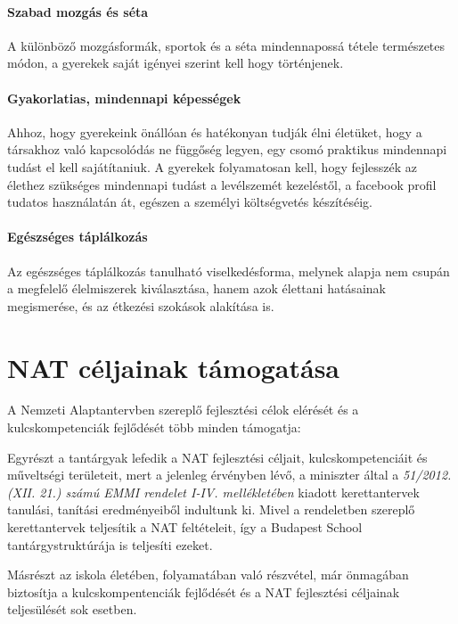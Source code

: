 \paragraph{Szabad mozgás és séta}

A különböző mozgásformák, sportok és a séta mindennapossá tétele természetes módon, a gyerekek saját igényei szerint kell hogy történjenek.

\paragraph{Gyakorlatias, mindennapi képességek}

Ahhoz, hogy gyerekeink önállóan és hatékonyan tudják élni életüket, hogy a társakhoz való kapcsolódás ne függőség legyen, egy csomó praktikus mindennapi tudást el kell sajátítaniuk. A gyerekek folyamatosan kell, hogy fejlesszék az élethez szükséges mindennapi tudást a levélszemét kezeléstől, a facebook profil tudatos használatán át, egészen a személyi költségvetés készítéséig.

\paragraph{Egészséges táplálkozás}

Az egészséges táplálkozás tanulható viselkedésforma, melynek alapja nem csupán a megfelelő élelmiszerek kiválasztása, hanem azok élettani hatásainak megismerése, és az étkezési szokások alakítása is.

\section{NAT céljainak támogatása}

A Nemzeti Alaptantervben szereplő fejlesztési célok elérését és a kulcskompetenciák fejlődését több minden támogatja:

Egyrészt a tantárgyak lefedik a NAT fejlesztési céljait, kulcskompetenciáit és műveltségi területeit, mert a jelenleg érvényben lévő, a miniszter által a \emph{51/2012. (XII. 21.) számú EMMI rendelet I-IV. mellékletében} kiadott kerettantervek\cite{ofi:kerettanterv} tanulási, tanítási eredményeiből indultunk ki. Mivel a rendeletben szereplő kerettantervek teljesítik a NAT feltételeit, így a Budapest School tantárgystruktúrája is teljesíti ezeket.

Másrészt az iskola életében, folyamatában való részvétel, már önmagában biztosítja a kulcskompentenciák fejlődését és a NAT fejlesztési céljainak teljesülését  sok esetben.

